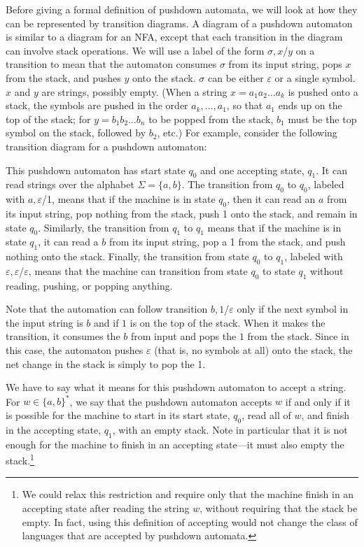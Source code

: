 Before giving a formal definition of pushdown automata, we will look
at how they can be represented by transition diagrams.  A diagram of
a pushdown automaton is similar to a diagram for an NFA, except that
each transition in the diagram can involve stack operations.  We will
use a label of the form $\sigma,x$/$y$ on a transition to mean
that the automaton consumes $\sigma$ from its input string, pops
$x$ from the stack, and pushes $y$ onto the stack.  $\sigma$ can be
either $\varepsilon$ or a single symbol.
$x$ and $y$ are strings, possibly empty. (When a string $x=a_1a_2\dots a_k$ is
pushed onto a stack, the symbols are pushed in the order $a_k,\dots,a_1$, so that
$a_1$ ends up on the top of the stack; for $y=b_1b_2\dots b_n$ to be popped
from the stack, $b_1$ must be the top symbol on the stack, followed by $b_2$, etc.) 
For example, consider the following transition diagram for a pushdown automaton:

\medskip
\centerline{}
\smallskip

This pushdown automaton has start state $q_0$ and one accepting
state, $q_1$.  It can read strings over the alphabet $\Sigma=\{a,b\}$.
The transition from $q_0$ to $q_0$, labeled with $a,\varepsilon$/1,
means that if the machine is in state $q_0$, then it can read an
$a$ from its input string, pop nothing from the stack, push 1 onto
the stack, and remain in state $q_0$.  Similarly, the transition
from $q_1$ to $q_1$ means that if the machine is in state $q_1$,
it can read a $b$ from its input string, pop a 1 from the stack,
and push nothing onto the stack.  Finally, the transition
from state $q_0$ to $q_1$, labeled with $\varepsilon,\varepsilon$/$\varepsilon$,
means that the machine can transition from state $q_0$ to state $q_1$
without reading, pushing, or popping anything.

Note that the automation can follow transition $b,1$/$\varepsilon$ only
if the next symbol in the input string is $b$ and if $1$ is on the 
top of the stack.  When it makes the transition, it consumes the $b$ from
input and pops the $1$ from the stack.  Since in this case, the automaton
pushes $\varepsilon$ (that is, no symbols at all) onto the stack, the net
change in the stack is simply to pop the 1.

We have to say what it means for this pushdown automaton to accept
a string.  For $w\in\{a,b\}^*$, we say that the pushdown automaton
accepts $w$ if and only if it is possible for the machine to start
in its start state, $q_0$, read all of $w$, and finish in the
accepting state, $q_1$, with an empty stack.  Note in particular that
it is not enough for the machine to finish in an accepting state---it
must also empty the stack.\footnote{We could relax this restriction
and require only that the machine finish in an accepting state after
reading the string $w$, without requiring that the stack be empty.
In fact, using this definition of accepting would not change the
class of languages that are accepted by pushdown automata.}

